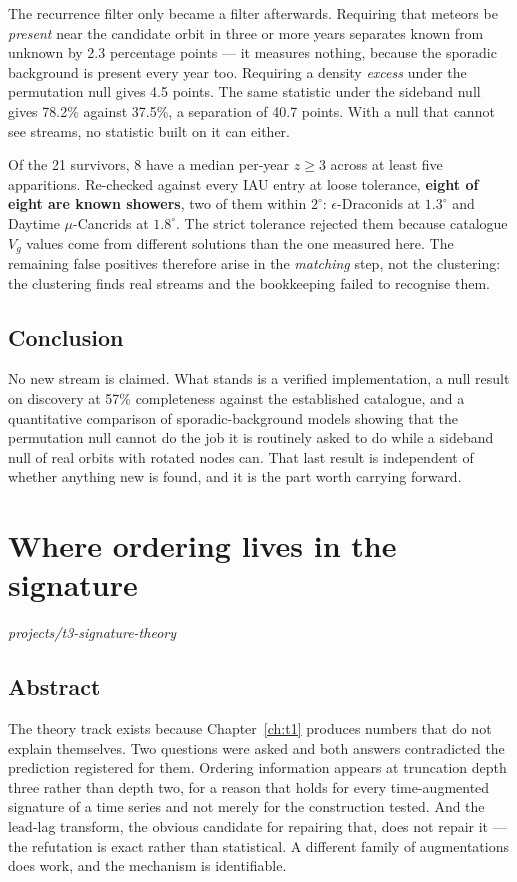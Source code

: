 \documentclass[11pt,a4paper]{report}
\begin{document}
The recurrence filter only became a filter afterwards. Requiring that meteors be
\emph{present} near the candidate orbit in three or more years separates known from unknown by
2.3 percentage points --- it measures nothing, because the sporadic background is present every
year too. Requiring a density \emph{excess} under the permutation null gives 4.5 points. The
same statistic under the sideband null gives 78.2\% against 37.5\%, a separation of 40.7
points. With a null that cannot see streams, no statistic built on it can either.

Of the 21 survivors, 8 have a median per-year $z \ge 3$ across at least five apparitions.
Re-checked against every IAU entry at loose tolerance, \textbf{eight of eight are known
showers}, two of them within $2^\circ$: $\epsilon$-Draconids at $1.3^\circ$ and Daytime
$\mu$-Cancrids at $1.8^\circ$. The strict tolerance rejected them because catalogue $V_g$
values come from different solutions than the one measured here. The remaining false positives
therefore arise in the \emph{matching} step, not the clustering: the clustering finds real
streams and the bookkeeping failed to recognise them.

\section{Conclusion}

No new stream is claimed. What stands is a verified implementation, a null result on discovery
at 57\% completeness against the established catalogue, and a quantitative comparison of
sporadic-background models showing that the permutation null cannot do the job it is routinely
asked to do while a sideband null of real orbits with rotated nodes can. That last result is
independent of whether anything new is found, and it is the part worth carrying forward.



\chapter{Where ordering lives in the signature}
\label{ch:t3}
\noindent\textit{projects/t3-signature-theory}

\section*{Abstract}

The theory track exists because Chapter~\ref{ch:t1} produces numbers that do not explain
themselves. Two questions were asked and both answers contradicted the prediction registered
for them. Ordering information appears at truncation depth three rather than depth two, for a
reason that holds for every time-augmented signature of a time series and not merely for the
construction tested. And the lead-lag transform, the obvious candidate for repairing that,
does not repair it --- the refutation is exact rather than statistical. A different family of
augmentations does work, and the mechanism is identifiable.
\end{document}
